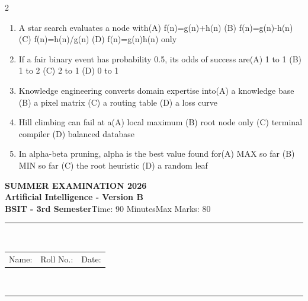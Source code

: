\documentclass[a4paper]{article}
\makeatletter
\newcommand{\examheader}{%
\begin{center}\textbf{\large SUMMER EXAMINATION 2026}\\[-1pt]
\textbf{\normalsize Artificial Intelligence - Version B}\\[-1pt]
\textbf{BSIT - 3rd Semester}\quad Time: 90 Minutes\quad Max Marks: 80\\[-1pt]
\textcolor{black!65}{\rule{\linewidth}{0.45pt}}\\[-2pt]
\begin{tabularx}{\linewidth}{@{}X X X@{}}Name: \hrulefill & Roll No.: \hrulefill & Date: \hrulefill\end{tabularx}\\[-1pt]
\textcolor{black!65}{\rule{\linewidth}{0.45pt}}\end{center}}
\makeatother
\begin{document}
\begin{multicols*}{2}
\begin{enumerate}
\item A star search evaluates a node with\newline\hspace*{0.6em}(A) f(n)=g(n)+h(n) \quad (B) f(n)=g(n)-h(n) \newline\hspace*{0.6em}(C) f(n)=h(n)/g(n) \quad (D) f(n)=g(n)h(n) only
\item If a fair binary event has probability 0.5, its odds of success are\newline\hspace*{0.6em}(A) 1 to 1 \quad (B) 1 to 2 \newline\hspace*{0.6em}(C) 2 to 1 \quad (D) 0 to 1
\item Knowledge engineering converts domain expertise into\newline\hspace*{0.6em}(A) a knowledge base \quad (B) a pixel matrix \newline\hspace*{0.6em}(C) a routing table \quad (D) a loss curve
\item Hill climbing can fail at a\newline\hspace*{0.6em}(A) local maximum \quad (B) root node only \newline\hspace*{0.6em}(C) terminal compiler \quad (D) balanced database
\item In alpha-beta pruning, alpha is the best value found for\newline\hspace*{0.6em}(A) MAX so far \quad (B) MIN so far \newline\hspace*{0.6em}(C) the root heuristic \quad (D) a random leaf
\end{enumerate}
\end{multicols*}
\newpage
\examheader
\raggedcolumns
\end{document}
